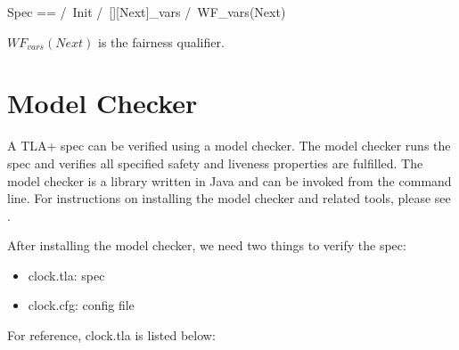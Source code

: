 \begin{tla}
    Spec ==
        /\ Init
        /\ [][Next]_vars
        /\ WF_vars(Next)
\end{tla}
\begin{tlatex}
%
%
%
%
\end{tlatex}
\newline

$WF_{vars}(Next)$ is the fairness qualifier.


\section{Model Checker}

A TLA+ spec can be verified using a model checker. The model checker runs the spec
and verifies all specified safety and liveness properties are fulfilled. The
model checker is a library written in Java and can be invoked from the command
line. For instructions on installing the model checker and related tools, please
see \cite{toolbox}.\newline

After installing the model checker, we need two things to verify the spec:
\begin{itemize}
    \item clock.tla: spec 
    \item clock.cfg: config file
\end{itemize}

For reference, clock.tla is listed below:\newline

